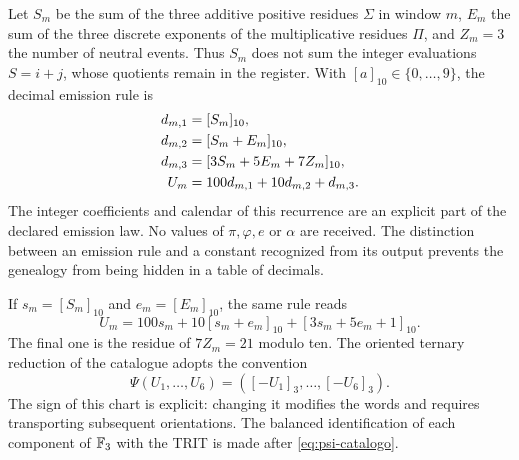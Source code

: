 Let \(S_m\) be the sum of the three additive positive residues \(\Sigma\) in window \(m\), \(E_m\) the sum of the three discrete exponents of the multiplicative residues \(\Pi\), and \(Z_m=3\) the number of neutral events. Thus \(S_m\) does not sum the integer evaluations \(S=i+j\), whose quotients remain in the register. With \([a]_{10}\in\{0,\ldots,9\}\), the decimal emission rule is
\begin{align}
 d_{m,1}&=[S_m]_{10},\notag\\
 d_{m,2}&=[S_m+E_m]_{10},\notag\\
 d_{m,3}&=[3S_m+5E_m+7Z_m]_{10},\notag\\
 U_m&=100d_{m,1}+10d_{m,2}+d_{m,3}.
 \label{eq:emisor-seis}
\end{align}
The integer coefficients and calendar of this recurrence are an explicit part of the declared emission law. No values of \(\pi,\varphi,e\) or \(\alpha\) are received. The distinction between an emission rule and a constant recognized from its output prevents the genealogy from being hidden in a table of decimals.

If \(s_m=[S_m]_{10}\) and \(e_m=[E_m]_{10}\), the same rule reads
\begin{equation}
 U_m=100s_m+10[s_m+e_m]_{10}+[3s_m+5e_m+1]_{10}.
 \label{eq:acoplamiento}
\end{equation}
The final one is the residue of \(7Z_m=21\) modulo ten. The oriented ternary reduction of the catalogue adopts the convention
\begin{equation}
 \Psi(U_1,\ldots,U_6)=([-U_1]_3,\ldots,[-U_6]_3).
 \label{eq:psi-catalogo}
\end{equation}
The sign of this chart is explicit: changing it modifies the words and requires transporting subsequent orientations. The balanced identification of each component of \(\mathbb F_3\) with the TRIT is made after \eqref{eq:psi-catalogo}.

